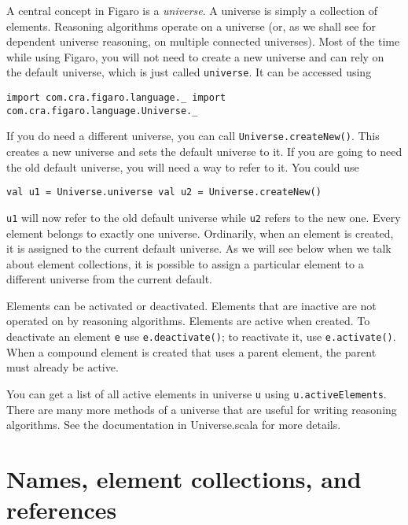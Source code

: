 A central concept in Figaro is a \emph{universe}. A universe is simply a collection of elements. Reasoning algorithms operate on a universe (or, as we shall see for dependent universe reasoning, on multiple connected universes). Most of the time while using Figaro, you will not need to create a new universe and can rely on the default universe, which is just called \texttt{universe}. It can be accessed using

\begin{flushleft}
\texttt{import com.cra.figaro.language.\_
\newline import com.cra.figaro.language.Universe.\_}
\end{flushleft}

If you do need a different universe, you can call \texttt{Universe.create\-New()}. This creates a new universe and sets the default universe to it. If you are going to need the old default universe, you will need a way to refer to it. You could use

\begin{flushleft}
\texttt{val u1 = Universe.universe
\newline val u2 = Universe.createNew()}
\end{flushleft}

\texttt{u1} will now refer to the old default universe while \texttt{u2} refers to the new one. Every element belongs to exactly one universe. Ordinarily, when an element is created, it is assigned to the current default universe. As we will see below when we talk about element collections, it is possible to assign a particular element to a different universe from the current default.

Elements can be activated or deactivated. Elements that are inactive are not operated on by reasoning algorithms. Elements are active when created. To deactivate an element \texttt{e} use \texttt{e.deactivate()}; to reactivate it, use \texttt{e.activate()}. When a compound element is created that uses a parent element, the parent must already be active.

You can get a list of all active elements in universe \texttt{u} using \texttt{u.active\-Elements}. There are many more methods of a universe that are useful for writing reasoning algorithms. See the documentation in Universe.scala for more details.

\section{Names, element collections, and references}

